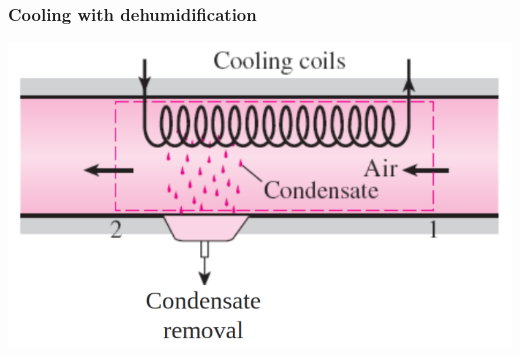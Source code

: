 \documentclass[11pt]{article}
\begin{document}
 \newpage

\subsubsection{Cooling with dehumidification}
\label{sec:org73d1d4e}
\begin{center}
\includegraphics[scale=0.5]{./images/cooling-with-dehumidification-diagram.png}
\end{center}
\end{document}
